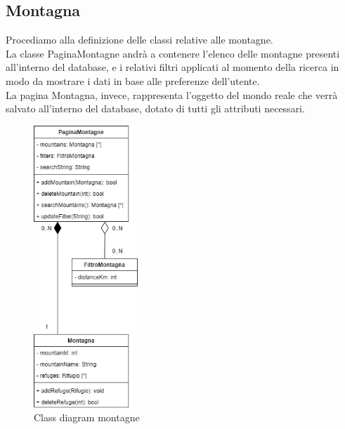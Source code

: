 \documentclass[a4paper,12pt]{article}
\begin{document}
\subsection{Montagna}
Procediamo alla definizione delle classi relative alle montagne. \\
La classe PaginaMontagne andrà a contenere l'elenco delle montagne presenti all'interno del database, e i relativi filtri applicati al momento della ricerca in modo da mostrare i dati in base alle preferenze dell'utente.\\
La pagina Montagna, invece, rappresenta l'oggetto del mondo reale che verrà salvato all'interno del database, dotato di tutti gli attributi necessari.
\begin{figure}[H]
   \centering
   \includegraphics[width=0.35\textwidth] {D3/img/class_diagram_mountains.png}
    \caption{Class diagram montagne}
\end{figure}
\newpage
\end{document}
